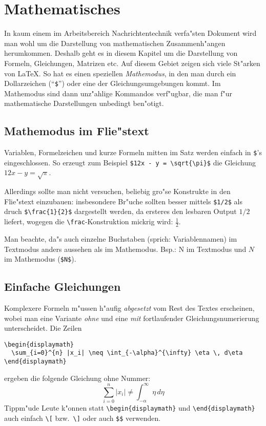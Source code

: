 \chapter{Mathematisches} \label{CPTmath}
%
In kaum einem im Arbeitsbereich Nachrichtentechnik verfa"sten Dokument 
wird man wohl um die Darstellung von mathematischen Zusammenh"angen 
herumkommen. Deshalb geht es in diesem Kapitel um die Darstellung von
Formeln, Gleichungen, Matrizen etc. Auf diesem Gebiet zeigen sich viele
St"arken von \LaTeX. So hat es einen speziellen {\em Mathemodus}, in den
man durch ein Dollarzeichen (``\verb+$+'') oder eine der Gleichungsumgebungen
kommt. Im Mathemodus sind dann unz"ahlige Kommandos verf"ugbar, die man
f"ur mathematische Darstellungen unbedingt ben"otigt. 

\section{Mathemodus im Flie"stext} \label{SECfliess}

Variablen, Formelzeichen und kurze Formeln mitten im Satz werden einfach in 
{\tt \$}'s eingeschlossen. So erzeugt zum Beispiel \verb+$12x - y = \sqrt{\pi}$+
die Gleichung $12x - y = \sqrt{\pi}$. 

Allerdings sollte man nicht versuchen,
beliebig gro"se Konstrukte in den Flie"stext einzubauen: insbesondere Br"uche
sollten besser mittels \verb+$1/2$+ als druch \verb+$\frac{1}{2}$+ dargestellt werden, 
da ersteres den lesbaren Output $1/2$ liefert, wogegen die \verb+\frac+-Konstruktion 
mickrig wird: $\frac{1}{2}$.

Man beachte, da"s auch einzelne Buchstaben
(sprich: Variablennamen) im Textmodus anders aussehen als im Mathemodus. Bsp.:
N im Textmodus und $N$ im Mathemodus (\verb+$N$+).

\section{Einfache Gleichungen} \label{SECeinfg}

Komplexere Formeln m"ussen h"aufig {\em abgesetzt} vom Rest des Textes erscheinen, 
wobei man eine Variante {\em ohne} und eine {\em mit} fortlaufender 
Gleichungsnumerierung unterscheidet. Die Zeilen 
%
\begin{verbatim}
\begin{displaymath}
  \sum_{i=0}^{n} |x_i| \neq \int_{-\alpha}^{\infty} \eta \, d\eta
\end{displaymath}
\end{verbatim}
%
ergeben die folgende Gleichung ohne Nummer:
%
\begin{displaymath}
  \sum_{i=0}^{n} |x_i| \neq \int_{-\alpha}^{\infty} \eta \, d\eta
\end{displaymath}
%
Tippm"ude Leute k"onnen statt \verb+\begin{displaymath}+ und \verb+\end{displaymath}+
auch einfach \verb+\[+ bzw.\ \verb+\]+ oder auch \verb+$$+ verwenden.

